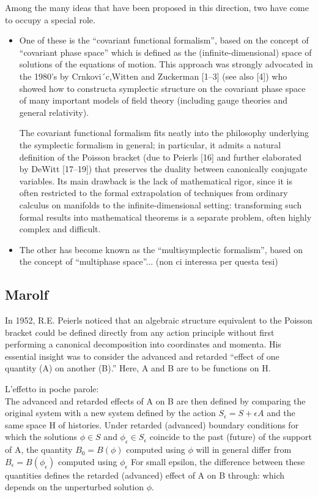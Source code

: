 \documentclass[Main]{subfiles}
\begin{document}
			Among the many ideas that have been proposed in this direction, two have come to occupy a special role. 
			\begin{itemize}
				\item  One of these is the “covariant functional formalism”, based on the concept
				of “covariant phase space” which is defined as the (infinite-dimensional) space of solutions of the equations of motion. 
				This approach was strongly advocated in the 1980’s by Crnkovi´c,Witten and Zuckerman [1–3] (see also [4]) who showed how to constructa symplectic structure on the covariant phase space of many important models of field theory (including gauge theories and general relativity).
				
				The covariant functional formalism fits neatly into the philosophy underlying the symplectic formalism in general; in particular, it admits a natural definition of the Poisson bracket (due to Peierls [16] and further elaborated by DeWitt [17–19]) that preserves the duality between canonically conjugate variables. 
				Its main drawback is the lack of mathematical rigor, since it is often restricted to the formal extrapolation of techniques from ordinary calculus on manifolds to the infinite-dimensional setting: transforming such formal results into mathematical theorems is a separate problem, often highly complex and difficult.
				\item The other has become known as the “multisymplectic formalism”, based on the concept of “multiphase space”... (non ci interessa per questa tesi)
\end{itemize}			

		\subsection{Marolf}
			In 1952, R.E. Peierls noticed that an algebraic structure equivalent to the Poisson bracket could be defined directly from any action principle without first performing a canonical decomposition into coordinates and momenta. 
			His essential insight was to consider the advanced and retarded “effect of one quantity (A) on another (B).” Here, A and B are to
be functions on H. 

			L'effetto in poche parole:\\
			The advanced  and retarded  effects of A on B are then defined by comparing the original system with a new system defined by the action $S_\epsilon = S + \epsilon A$ and the same space H of histories. 
			Under retarded (advanced) boundary conditions for which the solutions $\phi \in S$ and $\phi_\epsilon	\in S_\epsilon$ coincide to the past (future) of the support of A, the quantity $B_0 = B(\phi)$ computed using $\phi$ will in general differ from $B_\epsilon = B(\phi_\epsilon)$ computed using $\phi_\epsilon$
For small epsilon, the difference between these quantities defines the retarded (advanced) effect of A on B through:
which depends on the unperturbed solution $\phi$.
\end{document}
